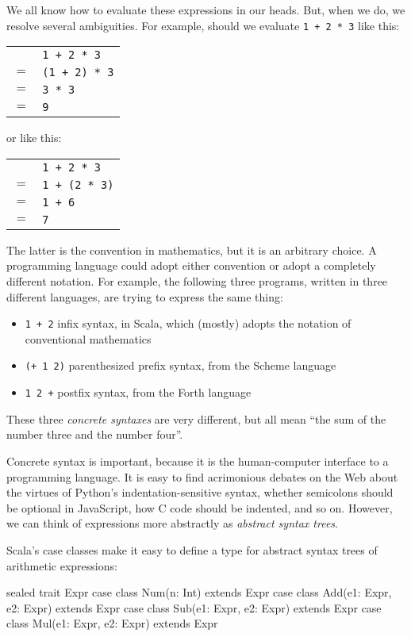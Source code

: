 We all know how to evaluate these expressions in our heads. But, when we do,
we resolve several ambiguities. For example, should we evaluate \verb|1 + 2 * 3|
like this:

\begin{tabular}{ll}
& \verb|1 + 2 * 3| \\
$=$ & \verb|(1 + 2) * 3| \\
$=$ & \verb|3 * 3| \\
$=$ & \verb|9|
\end{tabular}

\noindent or like this:

\begin{tabular}{ll}
& \verb|1 + 2 * 3| \\
$=$ & \verb|1 + (2 * 3)| \\
$=$ & \verb|1 + 6| \\
$=$ & \verb|7|
\end{tabular}

The latter is the convention in mathematics, but it is an arbitrary choice.
A programming language could adopt either convention or adopt a completely
different notation. For example, the following three programs, written
in three different languages, are trying to express the same thing:
%
\begin{itemize}

\item \verb|1 + 2| infix syntax, in Scala, which (mostly) adopts the notation of
   conventional mathematics

\item \verb|(+ 1 2)| parenthesized prefix syntax, from the Scheme language

\item \verb|1 2 +| postfix syntax, from the Forth language

\end{itemize}
%
These three \emph{concrete syntaxes} are very different, but all mean
``the sum of the number three and the number four''.

Concrete syntax is important, because it is the human-computer interface to a
programming language. It is easy to find acrimonious debates on the Web about
the virtues of Python's indentation-sensitive syntax, whether semicolons should
be optional in JavaScript, how C code should be indented, and so on. However,
we can think of expressions more abstractly as \emph{abstract syntax trees}.  

Scala's case classes make it easy to define a type for abstract syntax trees
of arithmetic expressions:
%
\begin{scalacode}
sealed trait Expr
case class Num(n: Int) extends Expr
case class Add(e1: Expr, e2: Expr) extends Expr
case class Sub(e1: Expr, e2: Expr) extends Expr
case class Mul(e1: Expr, e2: Expr) extends Expr
\end{scalacode}

